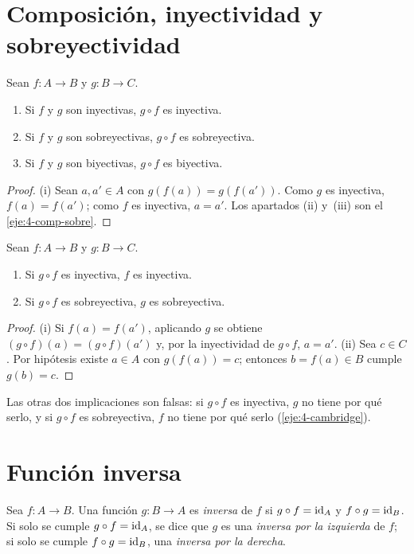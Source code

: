 \section{Composición, inyectividad y sobreyectividad}

\begin{teorema}\label{teo:t4-comp}
Sean $f\colon A\to B$ y $g\colon B\to C$.
\begin{enumerate}
  \item Si $f$ y $g$ son inyectivas, $g\circ f$ es inyectiva.
  \item Si $f$ y $g$ son sobreyectivas, $g\circ f$ es sobreyectiva.
  \item Si $f$ y $g$ son biyectivas, $g\circ f$ es biyectiva.
\end{enumerate}
\end{teorema}

\begin{proof}
(i) Sean $a,a'\in A$ con $g(f(a))=g(f(a'))$. Como $g$ es inyectiva, $f(a)=f(a')$; como $f$ es inyectiva, $a=a'$. Los apartados (ii) y~(iii) son el \cref{eje:4-comp-sobre}.
\end{proof}

\begin{proposicion}\label{prop:t4-reciproco}
Sean $f\colon A\to B$ y $g\colon B\to C$.
\begin{enumerate}
  \item Si $g\circ f$ es inyectiva, $f$ es inyectiva.
  \item Si $g\circ f$ es sobreyectiva, $g$ es sobreyectiva.
\end{enumerate}
\end{proposicion}

\begin{proof}
(i) Si $f(a)=f(a')$, aplicando $g$ se obtiene $(g\circ f)(a)=(g\circ f)(a')$ y, por la inyectividad de $g\circ f$, $a=a'$. (ii) Sea $c\in C$. Por hipótesis existe $a\in A$ con $g(f(a))=c$; entonces $b=f(a)\in B$ cumple $g(b)=c$.
\end{proof}

Las otras dos implicaciones son falsas: si $g\circ f$ es inyectiva, $g$ no tiene por qué serlo, y si $g\circ f$ es sobreyectiva, $f$ no tiene por qué serlo (\cref{eje:4-cambridge}).

\section{Función inversa}

\begin{definicion}[Inversa]
Sea $f\colon A\to B$. Una función $g\colon B\to A$ es \emph{inversa} de $f$ si $g\circ f=\mathrm{id}_A$ y $f\circ g=\mathrm{id}_B$. Si solo se cumple $g\circ f=\mathrm{id}_A$, se dice que $g$ es una \emph{inversa por la izquierda} de $f$; si solo se cumple $f\circ g=\mathrm{id}_B$, una \emph{inversa por la derecha}.
\end{definicion}

